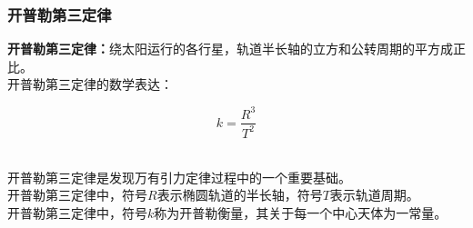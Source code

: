 \documentclass[UTF8]{ctexart}
\begin{document}
\subsubsection{开普勒第三定律}
    \textbf{开普勒第三定律：}绕太阳运行的各行星，轨道半长轴的立方和公转周期的平方成正比。\\[3mm]
    开普勒第三定律的数学表达：
    \begin{large}
        \begin{equation*}
            k=\frac{R^3}{T^2}
        \end{equation*}
    \end{large}\\
    开普勒第三定律是发现万有引力定律过程中的一个重要基础。\\[3mm]
    开普勒第三定律中，符号$R$表示椭圆轨道的半长轴，符号$T$表示轨道周期。\\[3mm]
    开普勒第三定律中，符号$k$称为开普勒衡量，其关于每一个中心天体为一常量。

\newpage
\end{document}
